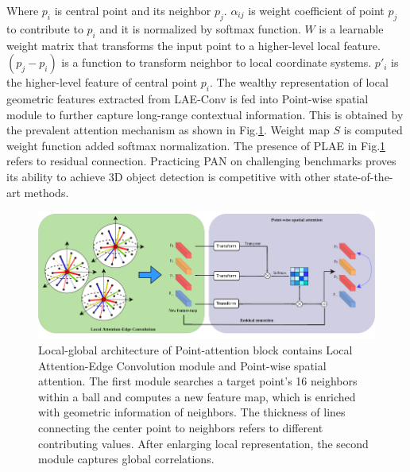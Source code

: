 Where $p_i$ is central point and its neighbor $p_j$. $\alpha_{ij}$ is weight coefficient of point $p_j$ to contribute to $p_i$ and it is normalized by softmax function. $W$ is a learnable weight matrix that transforms the input point to a higher-level local feature. $(p_j-p_i)$ is a function to transform neighbor to local coordinate systems. $p'_i$ is the higher-level feature of central point $p_i$. The wealthy representation of local geometric features extracted from LAE-Conv is fed into Point-wise spatial module to further capture long-range contextual information. This is obtained by the prevalent attention mechanism as shown in Fig.\ref{fig:point_attention}. Weight map $S$ is computed weight function added softmax normalization. The presence of PLAE in Fig.\ref{fig:point_attention} refers to residual connection. Practicing PAN on challenging benchmarks proves its ability to achieve 3D object detection is competitive with other state-of-the-art methods.
\begin{figure}[h!]
\centering
\includegraphics[width= \linewidth]{figs/Point_attention.png}
\caption{Local-global architecture of Point-attention block contains Local Attention-Edge Convolution module and Point-wise spatial attention. The first module searches a target point's 16 neighbors within a ball and computes a new feature map, which is enriched with geometric information of neighbors. The thickness of lines connecting the center point to neighbors refers to different contributing values. After enlarging local representation, the second module captures global correlations.}
\label{fig:point_attention}
\end{figure}

